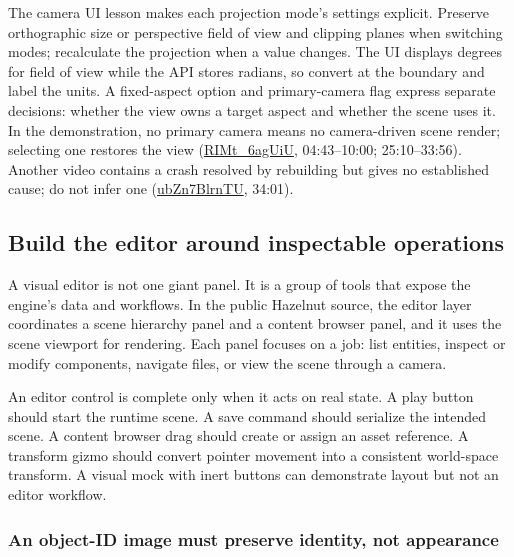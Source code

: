 The camera UI lesson makes each projection mode's settings explicit. Preserve orthographic size or perspective field of view and clipping planes when switching modes; recalculate the projection when a value changes. The UI displays degrees for field of view while the API stores radians, so convert at the boundary and label the units. A fixed-aspect option and primary-camera flag express separate decisions: whether the view owns a target aspect and whether the scene uses it. In the demonstration, no primary camera means no camera-driven scene render; selecting one restores the view (\href{https://www.youtube.com/watch?v=RIMt_6agUiU}{RIMt\_6agUiU}, 04:43--10:00; 25:10--33:56). Another video contains a crash resolved by rebuilding but gives no established cause; do not infer one (\href{https://www.youtube.com/watch?v=ubZn7BlrnTU}{ubZn7BlrnTU}, 34:01).

\subsection{Build the editor around inspectable operations}\label{06-engine-ii-ch032-build-the-editor-around-inspectable-operations}

\hypertarget{06-engine-ii-ch032-build-the-editor-around-inspectable-operations}{}

A visual editor is not one giant panel. It is a group of tools that expose the engine's data and workflows. In the public Hazelnut source, the editor layer coordinates a scene hierarchy panel and a content browser panel, and it uses the scene viewport for rendering. Each panel focuses on a job: list entities, inspect or modify components, navigate files, or view the scene through a camera.

An editor control is complete only when it acts on real state. A play button should start the runtime scene. A save command should serialize the intended scene. A content browser drag should create or assign an asset reference. A transform gizmo should convert pointer movement into a consistent world-space transform. A visual mock with inert buttons can demonstrate layout but not an editor workflow.

\subsubsection{An object-ID image must preserve identity, not appearance}\label{06-engine-ii-ch032-an-object-id-image-must-preserve-identity-not-appearance}

\hypertarget{06-engine-ii-ch032-an-object-id-image-must-preserve-identity-not-appearance}{}

